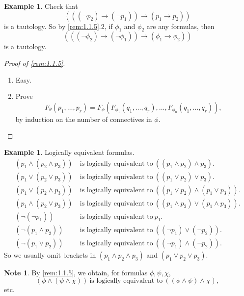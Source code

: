 \documentclass{article}
\newcommand{\rb}[1]{\left( #1 \right)}
\newcommand{\notb}[1]{\rb{\neg #1}}
\newcommand{\orb}[2]{\rb{#1 \lor #2}}
\newcommand{\andb}[2]{\rb{#1 \land #2}}
\newcommand{\impb}[2]{\rb{#1 \rightarrow #2}}
\theoremstyle{definition}\newtheorem{definition}{Definition}[subsection]
\theoremstyle{definition}\newtheorem{remark1}[definition]{Remark}
\theoremstyle{definition}\newtheorem{example1}[definition]{Example}
\theoremstyle{definition}\newtheorem*{remark2}{Remark}
\theoremstyle{definition}\newtheorem*{example2}{Example}
\theoremstyle{definition}\newtheorem*{note}{Note}
\theoremstyle{definition}\newtheorem*{notation}{Notation}
\begin{document}
\pagebreak

\begin{example1}
Check that
$$ \impb{\impb{\notb{p_2}}{\notb{p_1}}}{\impb{p_1}{p_2}} $$
is a tautology. So by \ref{rem:1.1.5}.$ 2 $, if $ \phi_1 $ and $ \phi_2 $ are any formulas, then
$$ \impb{\impb{\notb{\phi_2}}{\notb{\phi_1}}}{\impb{\phi_1}{\phi_2}} $$
is a tautology.
\end{example1}

\begin{proof}[Proof of \ref{rem:1.1.5}]
\hfill
\begin{enumerate}
\item Easy.
\item Prove
$$ F_\theta\rb{p_1, \dots, p_r} = F_\phi\rb{F_{\phi_1}\rb{q_1, \dots, q_r}, \dots, F_{\phi_n}\rb{q_1, \dots, q_r}}, $$
by induction on the number of connectives in $ \phi $.
\end{enumerate}
\end{proof}

\begin{example2}
Logically equivalent formulas.
\begin{align*}
\andb{p_1}{\andb{p_2}{p_3}} \ & \text{is logically equivalent to} \ \andb{\andb{p_1}{p_2}}{p_3}. \\
\orb{p_1}{\orb{p_2}{p_3}} \ & \text{is logically equivalent to} \ \orb{\orb{p_1}{p_2}}{p_3}. \\
\orb{p_1}{\andb{p_2}{p_3}} \ & \text{is logically equivalent to} \ \andb{\orb{p_1}{p_2}}{\orb{p_1}{p_3}}. \\
\andb{p_1}{\orb{p_2}{p_3}} \ & \text{is logically equivalent to} \ \orb{\andb{p_1}{p_2}}{\andb{p_1}{p_3}}. \\
\notb{\notb{p_1}} \ & \text{is logically equivalent to} \ p_1. \\
\notb{\andb{p_1}{p_2}} \ & \text{is logically equivalent to} \ \orb{\notb{p_1}}{\notb{p_2}}. \\
\notb{\orb{p_1}{p_2}} \ & \text{is logically equivalent to} \ \andb{\notb{p_1}}{\notb{p_2}}.
\end{align*}
So we usually omit brackets in $ \rb{p_1 \land p_2 \land p_3} $ and $ \rb{p_1 \lor p_2 \lor p_3} $.
\end{example2}

\begin{note}
By \ref{rem:1.1.5}, we obtain, for formulas $ \phi, \psi, \chi $,
$$ \andb{\phi}{\andb{\psi}{\chi}} \ \text{is logically equivalent to} \ \andb{\andb{\phi}{\psi}}{\chi}, $$
etc.
\end{note}
\end{document}
